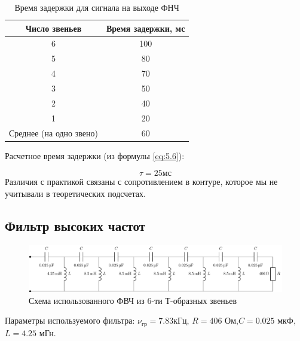 \begin{table}[H]
\caption{\label{tab:1}Время задержки для сигнала на выходе ФНЧ}
	\begin{center}
		\begin{tabular}{|c|c|}
		\hline
		Число звеньев & Время задержки, мс \\
		\hline
		6 & 100\\
		5 & 80\\
		4 & 70\\
		3 & 50\\
		2 & 40\\
		1 & 20\\
		\hline
		Среднее (на одно звено) & 60 \\
		\hline
		\end{tabular}
	\end{center}
\end{table}
Расчетное время задержки (из формулы \ref{eq:5.6}):

\begin{equation}
\tau=25 \text{мс}	
\end{equation}
Различия с практикой связаны с сопротивлением в контуре, которое мы не учитывали в теоретических подсчетах.
\subsection{Фильтр высоких частот}
\begin{figure}[H]
	\centering
	\includegraphics[scale=0.75]{chem/chem5}
	\caption{ Схема использованного ФВЧ из 6-ти Т-образных звеньев}
	\label{fig:4}
\end{figure}
Параметры используемого фильтра: $\nu_{\text{гр}}=7.83$кГц, $R=406$ Ом,$C=0.025$ мкФ,
$L=4.25$ мГн. 

